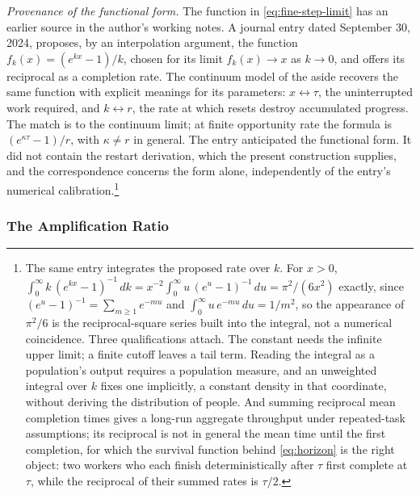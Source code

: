 \documentclass{article}
\begin{document}
\noindent\textit{Provenance of the functional form.} The function in \eqref{eq:fine-step-limit} has an earlier source in the author's working notes. A journal entry dated September 30, 2024, proposes, by an interpolation argument, the function $f_k(x) = (e^{kx} - 1)/k$, chosen for its limit $f_k(x) \to x$ as $k \to 0$, and offers its reciprocal as a completion rate. The continuum model of the aside recovers the same function with explicit meanings for its parameters: $x \leftrightarrow \tau$, the uninterrupted work required, and $k \leftrightarrow r$, the rate at which resets destroy accumulated progress. The match is to the continuum limit; at finite opportunity rate the formula is $(e^{\kappa\tau} - 1)/r$, with $\kappa \neq r$ in general. The entry anticipated the functional form. It did not contain the restart derivation, which the present construction supplies, and the correspondence concerns the form alone, independently of the entry's numerical calibration.\footnote{The same entry integrates the proposed rate over $k$. For $x > 0$, $\int_0^\infty k\,(e^{kx} - 1)^{-1}\,dk = x^{-2}\int_0^\infty u\,(e^{u} - 1)^{-1}\,du = \pi^{2}/(6x^{2})$ exactly, since $(e^{u} - 1)^{-1} = \sum_{m \ge 1} e^{-mu}$ and $\int_0^\infty u\,e^{-mu}\,du = 1/m^{2}$, so the appearance of $\pi^{2}/6$ is the reciprocal-square series built into the integral, not a numerical coincidence. Three qualifications attach. The constant needs the infinite upper limit; a finite cutoff leaves a tail term. Reading the integral as a population's output requires a population measure, and an unweighted integral over $k$ fixes one implicitly, a constant density in that coordinate, without deriving the distribution of people. And summing reciprocal mean completion times gives a long-run aggregate throughput under repeated-task assumptions; its reciprocal is not in general the mean time until the first completion, for which the survival function behind \eqref{eq:horizon} is the right object: two workers who each finish deterministically after $\tau$ first complete at $\tau$, while the reciprocal of their summed rates is $\tau/2$.}

\subsubsection{The Amplification Ratio}
\end{document}
